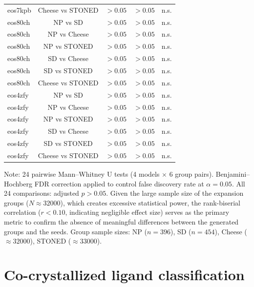 \documentclass[journal=jcisd8,manuscript=suppinfo]{achemso}
\begin{document}
\begin{table}[htbp]
\begin{tabular}{@{}l c c c c@{}}
eos7kpb & Cheese vs STONED & $> \num{0.05}$ & $> \num{0.05}$ & n.s. \\
eos80ch & NP vs SD & $> \num{0.05}$ & $> \num{0.05}$ & n.s. \\
eos80ch & NP vs Cheese & $> \num{0.05}$ & $> \num{0.05}$ & n.s. \\
eos80ch & NP vs STONED & $> \num{0.05}$ & $> \num{0.05}$ & n.s. \\
eos80ch & SD vs Cheese & $> \num{0.05}$ & $> \num{0.05}$ & n.s. \\
eos80ch & SD vs STONED & $> \num{0.05}$ & $> \num{0.05}$ & n.s. \\
eos80ch & Cheese vs STONED & $> \num{0.05}$ & $> \num{0.05}$ & n.s. \\
eos4zfy & NP vs SD & $> \num{0.05}$ & $> \num{0.05}$ & n.s. \\
eos4zfy & NP vs Cheese & $> \num{0.05}$ & $> \num{0.05}$ & n.s. \\
eos4zfy & NP vs STONED & $> \num{0.05}$ & $> \num{0.05}$ & n.s. \\
eos4zfy & SD vs Cheese & $> \num{0.05}$ & $> \num{0.05}$ & n.s. \\
eos4zfy & SD vs STONED & $> \num{0.05}$ & $> \num{0.05}$ & n.s. \\
eos4zfy & Cheese vs STONED & $> \num{0.05}$ & $> \num{0.05}$ & n.s. \\
\bottomrule
\end{tabular}
\end{table}

\begin{footnotesize}
Note: 24 pairwise Mann--Whitney U tests (4 models $\times$ 6 group pairs).
Benjamini--Hochberg FDR correction applied to control false discovery rate at $\alpha = \num{0.05}$.
All \num{24} comparisons: adjusted $p > \num{0.05}$. Given the large sample size of the expansion groups ($N \approx \num{32000}$), which creates excessive statistical power, the rank-biserial correlation ($r < \num{0.10}$, indicating negligible effect size) serves as the primary metric to confirm the absence of meaningful differences between the generated groups and the seeds.
Group sample sizes: NP ($n = \num{396}$), SD ($n = \num{454}$), Cheese ($\approx \num{32000}$), STONED ($\approx \num{33000}$).
\end{footnotesize}

\clearpage

\section*{Co-crystallized ligand classification}
\end{document}
